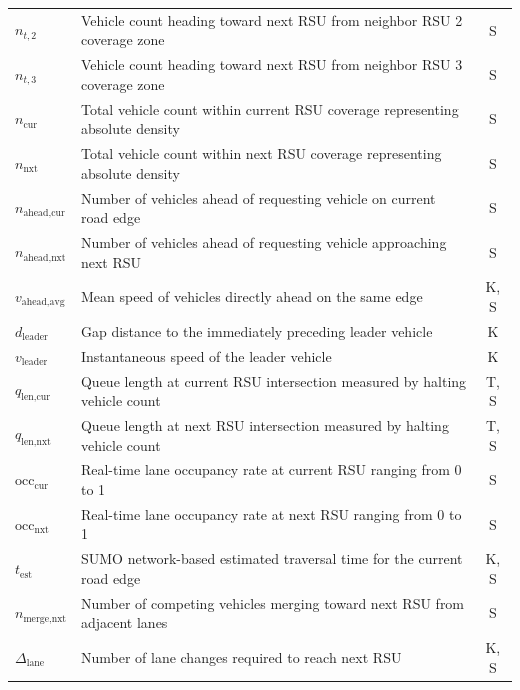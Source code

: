 \documentclass[journal]{IEEEtran}
\begin{document}
\begin{table}[!t]
\begin{tabular}{@{}lp{5.0cm}c@{}}
    $n_{t,2}$                 & Vehicle count heading toward next RSU from neighbor RSU 2 coverage zone      & S \\
    $n_{t,3}$                 & Vehicle count heading toward next RSU from neighbor RSU 3 coverage zone      & S \\
    $n_{\text{cur}}$          & Total vehicle count within current RSU coverage representing absolute density & S \\
    $n_{\text{nxt}}$          & Total vehicle count within next RSU coverage representing absolute density    & S \\
    $n_{\text{ahead,cur}}$    & Number of vehicles ahead of requesting vehicle on current road edge          & S \\
    $n_{\text{ahead,nxt}}$    & Number of vehicles ahead of requesting vehicle approaching next RSU          & S \\
    $v_{\text{ahead,avg}}$    & Mean speed of vehicles directly ahead on the same edge                       & K, S \\
    $d_{\text{leader}}$       & Gap distance to the immediately preceding leader vehicle                     & K \\
    $v_{\text{leader}}$       & Instantaneous speed of the leader vehicle                                    & K \\
    $q_{\text{len,cur}}$      & Queue length at current RSU intersection measured by halting vehicle count   & T, S \\
    $q_{\text{len,nxt}}$      & Queue length at next RSU intersection measured by halting vehicle count      & T, S \\
    $\text{occ}_{\text{cur}}$ & Real-time lane occupancy rate at current RSU ranging from 0 to 1             & S \\
    $\text{occ}_{\text{nxt}}$ & Real-time lane occupancy rate at next RSU ranging from 0 to 1                & S 	 \\
    $t_{\text{est}}$          & SUMO network-based estimated traversal time for the current road edge        & K, S \\
    $n_{\text{merge,nxt}}$    & Number of competing vehicles merging toward next RSU from adjacent lanes     & S \\
    $\Delta_{\text{lane}}$    & Number of lane changes required to reach next RSU                            & K, S \\
    \bottomrule
  \end{tabular}
\end{table}
\end{document}
